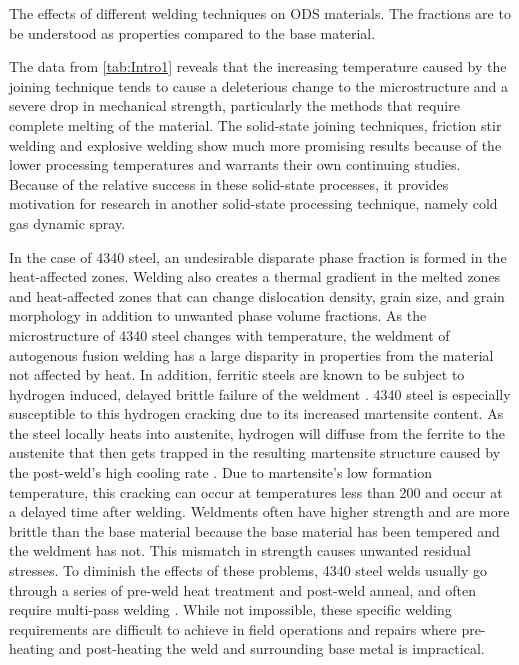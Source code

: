 	
	\begin{table}[]
		\caption{The effects of different welding techniques on ODS materials. The fractions are to be understood as properties compared to the base material.}
		
		\label{tab:Intro1}
	\end{table} 
	
	The data from \ref{tab:Intro1} reveals that the increasing temperature caused by the joining technique tends to cause a deleterious change to the microstructure and a severe drop in mechanical strength, particularly the methods that require complete melting of the material. The solid-state joining techniques, friction stir welding and explosive welding show much more promising results because of the lower processing temperatures and warrants their own continuing studies. Because of the relative success in these solid-state processes, it provides motivation for research in another solid-state processing technique, namely cold gas dynamic spray.
	
	In the case of 4340 steel, an undesirable disparate phase fraction is formed in the heat-affected zones. Welding also creates a thermal gradient in the melted zones and heat-affected zones that can change dislocation density, grain size, and grain morphology in addition to unwanted phase volume fractions. As the microstructure of 4340 steel changes with temperature, the weldment of autogenous fusion welding has a large disparity in properties from the material not affected by heat. In addition, ferritic steels are known to be subject to hydrogen induced, delayed brittle failure of the weldment \cite{RN771}. 4340 steel is especially susceptible to this hydrogen cracking due to its increased martensite content. As the steel locally heats into austenite, hydrogen will diffuse from the ferrite to the austenite that then gets trapped in the resulting martensite structure caused by the post-weld’s high cooling rate \cite{RN3387}. Due to martensite’s low formation temperature, this cracking can occur at temperatures less than 200 \celsius{} and occur at a delayed time after welding. Weldments often have higher strength and are more brittle than the base material because the base material has been tempered and the weldment has not. This mismatch in strength causes unwanted residual stresses. To diminish the effects of these problems, 4340 steel welds usually go through a series of pre-weld heat treatment and post-weld anneal, and often require multi-pass welding \cite{RN3361}. While not impossible, these specific welding requirements are difficult to achieve in field operations and repairs where pre-heating and post-heating the weld and surrounding base metal is impractical. 
	

